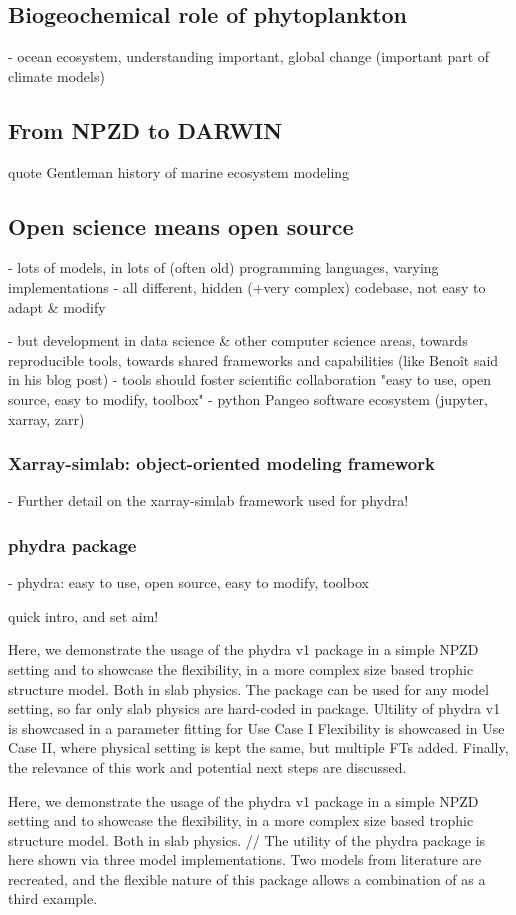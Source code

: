 \documentclass[journal abbreviation, manuscript]{copernicus}
\begin{document}
\introduction  %


\subsection{Biogeochemical role of phytoplankton}
- ocean ecosystem, understanding important, global change (important part of climate models)

\subsection{From NPZD to DARWIN}
quote Gentleman history of marine ecosystem modeling


\subsection{Open science means open source}
- lots of models, in lots of (often old) programming languages, varying implementations
- all different, hidden (+very complex) codebase, not easy to adapt \& modify

- but development in data science & other computer science areas, towards reproducible tools, towards shared frameworks and capabilities (like Benoît said in his blog post)
- tools should foster scientific collaboration
"easy to use, open source, easy to modify, toolbox"
- python Pangeo software ecosystem (jupyter, xarray, zarr)

\subsubsection{Xarray-simlab: object-oriented modeling framework}
- Further detail on the xarray-simlab framework used for phydra!

\subsubsection{phydra package}
- phydra: easy to use, open source, easy to modify, toolbox

quick intro, and set aim!

Here, we demonstrate the usage of the phydra v1 package in a simple NPZD setting and to showcase the flexibility, in a more complex size based trophic structure model. Both in slab physics.
The package can be used for any model setting, so far only slab physics are hard-coded in package.
Ultility of phydra v1 is showcased in a parameter fitting for Use Case I
Flexibility is showcased in Use Case II, where physical setting is kept the same, but multiple FTs added.
Finally, the relevance of this work and potential next steps are discussed.

Here, we demonstrate the usage of the phydra v1 package in a simple NPZD setting and to showcase the flexibility, in a more complex size based trophic structure model. Both in slab physics.
//
The utility of the phydra package is here shown via three model implementations. Two models from literature are recreated, and the flexible nature of this package allows a combination of as a third example. 
\end{document}
